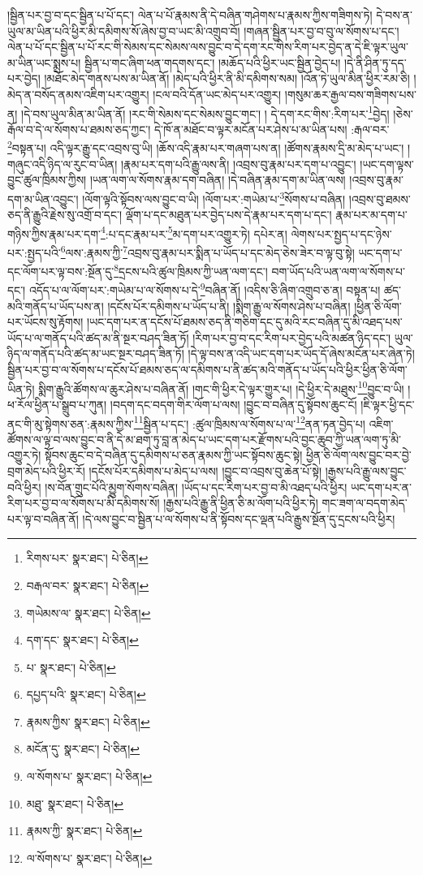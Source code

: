 །སྦྱིན་པར་བྱ་བ་དང་སྦྱིན་པ་པོ་དང་། ལེན་པ་པོ་རྣམས་ནི་དེ་བཞིན་གཤེགས་པ་རྣམས་ཀྱིས་གཟིགས་ཏེ། དེ་བས་ན་ཡུལ་མ་ཡིན་པའི་ཕྱིར་མི་དམིགས་སོ་ཞེས་བྱ་བ་ཡང་མི་འགྲུབ་བོ། །གཞན་སྦྱིན་པར་བྱ་བ་བུ་ལ་སོགས་པ་དང་། ལེན་པ་པོ་དང་སྦྱིན་པ་པོ་རང་གི་སེམས་དང་སེམས་ལས་བྱུང་བ་དེ་དག་རང་གིས་རིག་པར་བྱེད་ན་དེ་ཇི་ལྟར་ཡུལ་མ་ཡིན་ཡང་སྨྲས་པ། སྦྱིན་པ་གང་ཞིག་ཕན་གདགས་དང་། །མཆོད་པའི་ཕྱིར་ཡང་སྦྱིན་བྱེད་པ། །དེ་ནི་ཤིན་ཏུ་དད་པར་བྱེད། །མཐོང་མེད་གནས་པས་མ་ཡིན་ནོ། །མེད་པའི་ཕྱིར་ནི་མི་དམིགས་སམ། །འོན་ཏེ་ཡུལ་མིན་ཕྱིར་རམ་ཅི། །མེད་ན་བསོད་ནམས་འཇིག་པར་འགྱུར། །ངལ་བའི་དོན་ཡང་མེད་པར་འགྱུར། །གསུམ་ཆར་རྒྱལ་བས་གཟིགས་པས་ན། །དེ་བས་ཡུལ་མིན་མ་ཡིན་ནོ། །རང་གི་སེམས་དང་སེམས་བྱུང་གང་། །
དེ་དག་རང་གིས་:རིག་པར་\footnote{རིགས་པར་  སྣར་ཐང་།  པེ་ཅིན། }བྱེད། །ཅེས་རྒོལ་བ་དེ་ལ་སོགས་པ་ཐམས་ཅད་ཀྱང་། དེ་ཁོ་ན་མཐོང་བ་ལྟར་མངོན་པར་ཤེས་པ་མ་ཡིན་པས། :རྒལ་བར་\footnote{བརྒལ་བར་  སྣར་ཐང་།  པེ་ཅིན། }བསྟན་པ། འདི་ལྟར་རྒྱུ་དང་འབྲས་བུ་ཡི། །ཆོས་འདི་རྣམ་པར་གཞག་པས་ན། །ཚོགས་རྣམས་དྲི་མ་མེད་པ་ཡང་། །གཞུང་འདི་ཉིད་ལ་རུང་བ་ཡིན། །རྣམ་པར་དག་པའི་རྒྱུ་ལས་ནི། །འབྲས་བུ་རྣམ་པར་དག་པ་འབྱུང་། །ཡང་དག་ལྟས་བྱུང་ཚུལ་ཁྲིམས་ཀྱིས། །ཡན་ལག་ལ་སོགས་རྣམ་དག་བཞིན། །དེ་བཞིན་རྣམ་དག་མ་ཡིན་ལས། །འབྲས་བུ་རྣམ་དག་མ་ཡིན་འབྱུང་། །ལོག་ལྟའི་སྟོབས་ལས་བྱུང་བ་ཡི། །ལོག་པར་:གཡེམ་པ་\footnote{གཡེམས་ལ་  སྣར་ཐང་།  པེ་ཅིན། }སོགས་པ་བཞིན། །འབྲས་བུ་ཐམས་ཅད་ནི་རྒྱུའི་རྗེས་སུ་འགྲོ་བ་དང་། ལྡོག་པ་དང་མཐུན་པར་བྱེད་པས་དེ་རྣམ་པར་དག་པ་དང་། རྣམ་པར་མ་དག་པ་གཉིས་ཀྱིས་རྣམ་པར་དག་\footnote{དག་དང་  སྣར་ཐང་།  པེ་ཅིན། }:པ་དང་རྣམ་པར་\footnote{པ་  སྣར་ཐང་།  པེ་ཅིན། }མ་དག་པར་འགྱུར་ཏེ། དཔེར་ན། ལེགས་པར་སྤྱད་པ་དང་ཉེས་པར་:སྤྱད་པའི་\footnote{དཔྱད་པའི་  སྣར་ཐང་།  པེ་ཅིན། }ལས་:རྣམས་ཀྱི་\footnote{རྣམས་ཀྱིས་  སྣར་ཐང་།  པེ་ཅིན། }འབྲས་བུ་རྣམ་པར་སྨིན་པ་ཡོད་པ་དང་མེད་ཅེས་ཟེར་བ་ལྟ་བུ་སྟེ། ཡང་དག་པ་དང་ལོག་པར་ལྟ་བས་:སྔོན་དུ་\footnote{མངོན་དུ་  སྣར་ཐང་།  པེ་ཅིན། }དྲངས་པའི་ཚུལ་ཁྲིམས་ཀྱི་ཡན་ལག་དང་། བག་ཡོད་པའི་ཡན་ལག་ལ་སོགས་པ་དང་། འདོད་པ་ལ་ལོག་པར་:གཡེམ་པ་ལ་སོགས་པ་དེ་\footnote{ལ་སོགས་པ་  སྣར་ཐང་།  པེ་ཅིན། }བཞིན་ནོ། །འདིས་ཅི་ཞིག་འགྲུབ་ཅ་ན། བསྟན་པ། ཚད་མའི་གནོད་པ་ཡོད་པས་ན། །དངོས་པོར་དམིགས་པ་ཡོད་པ་ནི། །སྨིག་རྒྱུ་ལ་སོགས་ཤེས་པ་བཞིན། །ཕྱིན་ཅི་ལོག་པར་ཡོངས་སུ་རྟོགས། །ཡང་དག་པར་ན་དངོས་པོ་ཐམས་ཅད་ནི་གཅིག་དང་དུ་མའི་རང་བཞིན་དུ་མི་འཐད་པས་ཡོད་པ་ལ་གནོད་པའི་ཚད་མ་ནི་སྔར་བཤད་ཟིན་ཏོ། །རིག་པར་བྱ་བ་དང་རིག་པར་བྱེད་པའི་མཚན་ཉིད་དང་། ཡུལ་ཉིད་ལ་གནོད་པའི་ཚད་མ་ཡང་སྔར་བཤད་ཟིན་ཏོ། །དེ་ལྟ་བས་ན་འདི་ཡང་དག་པར་ཡོད་དོ་ཞེས་མངོན་པར་ཞེན་ཏེ། སྦྱིན་པར་བྱ་བ་ལ་སོགས་པ་དངོས་པོ་ཐམས་ཅད་ལ་དམིགས་པ་ནི་ཚད་མའི་གནོད་པ་ཡོད་པའི་ཕྱིར་ཕྱིན་ཅི་ལོག་ཡིན་ཏེ། སྨིག་རྒྱུའི་ཚོགས་ལ་ཆུར་ཤེས་པ་བཞིན་ནོ། །གང་གི་ཕྱིར་དེ་ལྟར་གྱུར་པ། །དེ་ཕྱིར་དེ་མཐུས་\footnote{མཐུ་  སྣར་ཐང་།  པེ་ཅིན། }བྱུང་བ་ཡི། །ཕ་རོལ་ཕྱིན་པ་སྒྲུབ་པ་ཀུན། །བདག་དང་བདག་གིར་ལོག་པ་ལས། །བྱུང་བ་བཞིན་དུ་སྟོབས་ཆུང་ངོ། །ཇི་ལྟར་ཕྱི་དང་ནང་གི་མུ་སྟེགས་ཅན་:རྣམས་ཀྱིས་\footnote{རྣམས་ཀྱི་  སྣར་ཐང་།  པེ་ཅིན། }སྦྱིན་པ་དང་། :ཚུལ་ཁྲིམས་ལ་སོགས་པ་ལ་\footnote{ལ་སོགས་པ་  སྣར་ཐང་།  པེ་ཅིན། }ནན་ཏན་བྱེད་པ། འཇིག་ཚོགས་ལ་ལྟ་བ་ལས་བྱུང་བ་ནི་དེ་མ་ཐག་ཏུ་བླ་ན་མེད་པ་ཡང་དག་པར་རྫོགས་པའི་བྱང་ཆུབ་ཀྱི་ཡན་ལག་ཏུ་མི་འགྱུར་ཏེ། སྟོབས་ཆུང་བ་དེ་བཞིན་དུ་དམིགས་པ་ཅན་རྣམས་ཀྱི་ཡང་སྟོབས་ཆུང་སྟེ། ཕྱིན་ཅི་ལོག་ལས་བྱུང་བར་བྱེ་བྲག་མེད་པའི་ཕྱིར་རོ། །དངོས་པོར་དམིགས་པ་མེད་པ་ལས། །བྱུང་བ་འབྲས་བུ་ཆེན་པོ་སྟེ། །རྒྱས་པའི་རྒྱུ་ལས་བྱུང་བའི་ཕྱིར། །ས་བོན་གྲུང་པོའི་མྱུག་སོགས་བཞིན། །ཡོད་པ་དང་རིག་པར་བྱ་བ་མི་འཐད་པའི་ཕྱིར། ཡང་དག་པར་ན་རིག་པར་བྱ་བ་ལ་སོགས་པ་མི་དམིགས་སོ། །རྒྱས་པའི་རྒྱུ་ནི་ཕྱིན་ཅི་མ་ལོག་པའི་ཕྱིར་ཏེ། གང་ཟག་ལ་བདག་མེད་པར་ལྟ་བ་བཞིན་ནོ། །དེ་ལས་བྱུང་བ་སྦྱིན་པ་ལ་སོགས་པ་ནི་སྟོབས་དང་ལྡན་པའི་རྒྱུས་སྔོན་དུ་དྲངས་པའི་ཕྱིར། 